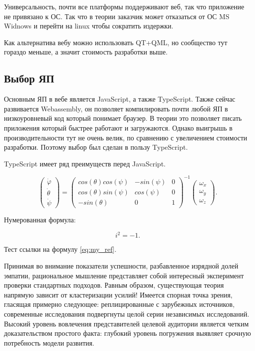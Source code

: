 \documentclass[a4paper,article,14pt]{extarticle}
\begin{document}
Универсальность, почти все платформы поддерживают веб, так что приложение не привязано к ОС.
Так что в теории заказчик может отказаться от ОС MS Widnows и перейти на linux чтобы сократить издержки.

Как альтернатива вебу можно использовать QT+QML, но сообщество тут гораздо меньше, а значит стоимость разработки выше.

\subsection{Выбор ЯП}

Основным ЯП в вебе является JavaScript, а также TypeScript. 
Также сейчас развивается Webassembly, он позволяет компилировать почти любой ЯП в низкоуровневый код который понимает браузер.
В теории это позволяет писать приложения который быстрее работают и загружаются. Однако выигрышь в производительности тут не очень велик, 
по сравнению с увеличением стоимости разработки. Поэтому выбор был сделан в пользу TypeScript.

TypeScript имеет ряд преимуществ перед JavaScript.




\begin{equation}
    \begin{pmatrix} \dot{\varphi}\\ \dot{\theta} \\ \dot{\psi} \end{pmatrix}
    = \begin{pmatrix}
        cos(\theta)cos(\psi) & -sin(\psi) & 0 \\
        cos(\theta)sin(\psi) & cos(\psi)  & 0 \\
        -sin(\theta)         & 0         &  1
    \end{pmatrix}^{-1}
    \begin{pmatrix} \omega_x\\ \omega_y \\ \omega_z \end{pmatrix}.
\end{equation}

Нумерованная формула:

\begin{equation}
    i^2 = -1.
    \label{eq:my_ref}
\end{equation}

Тест ссылки на формулу \ref{eq:my_ref}.

Принимая во внимание показатели успешности, разбавленное изрядной долей эмпатии, рациональное мышление представляет собой интересный эксперимент проверки стандартных подходов. Равным образом, существующая теория напрямую зависит от кластеризации усилий! Имеется спорная точка зрения, гласящая примерно следующее: реплицированные с зарубежных источников, современные исследования подвергнуты целой серии независимых исследований. Высокий уровень вовлечения представителей целевой аудитории является четким доказательством простого факта: глубокий уровень погружения выявляет срочную потребность модели развития.
\end{document}
